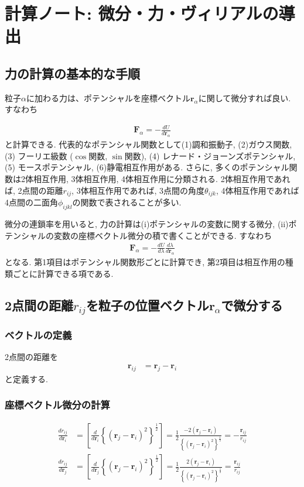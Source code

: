\clearpage
\section{計算ノート: 微分・力・ヴィリアルの導出}
\subsection{力の計算の基本的な手順}
粒子$\alpha$に加わる力は、ポテンシャルを座標ベクトル$\bm{r}_{\alpha}$に関して微分すれば良い. すなわち

\begin{align}
   \bm{F}_{\alpha}
   =
   -
   \frac{d U}{d \bm{r}_{\alpha}}
\end{align}
と計算できる.
代表的なポテンシャル関数として(1)調和振動子, (2)ガウス関数, (3) フーリエ級数 ($\cos$関数, $\sin$関数), (4) レナード・ジョーンズポテンシャル, (5) モースポテンシャル, (6)静電相互作用がある.
さらに, 多くのポテンシャル関数は2体相互作用, 3体相互作用, 4体相互作用に分類される.
2体相互作用であれば, 2点間の距離$r_{ij}$, 3体相互作用であれば, 3点間の角度$\theta_{ijk}$, 4体相互作用であれば4点間の二面角$\phi_{ijkl}$の関数で表されることが多い.

微分の連鎖率を用いると, 力の計算は(i)ポテンシャルの変数に関する微分, (ii)ポテンシャルの変数の座標ベクトル微分の積で書くことができる. すなわち
\begin{align}
   \bm{F}_{\alpha}
   =
   -
   \frac{d U}{d \lambda}
   \frac{d \lambda}{d \bm{r}_{\alpha}}
\end{align}
となる. 第1項目はポテンシャル関数形ごとに計算でき, 第2項目は相互作用の種類ごとに計算できる項である.


\subsection{2点間の距離$r_{ij}$を粒子の位置ベクトル$\bm{r}_{\alpha}$で微分する}
\subsubsection{ベクトルの定義}
2点間の距離を
\begin{align}
   \bm{r}_{ij}
&= \bm{r}_{j} - \bm{r}_{i}
\end{align}
と定義する.

\subsubsection{座標ベクトル微分の計算}
\begin{align}
\frac{d r_{ij}}{d \bm{r}_{i}}
&=
\left[
   \frac{d}{d \bm{r}_{i}}
   \left\{ (\bm{r}_{j} - \bm{r}_{i} )^{2} \right\}^{\frac{1}{2}}
\right]
=
\frac{1}{2}
\frac{ -2 (\bm{r}_{j} - \bm{r}_{i}) }
     { \left\{ ( \bm{r}_{j} - \bm{r}_{i} )^{2} \right\}^{\frac{1}{2}} }
=
-
\frac{\bm{r}_{ij}}{r_{ij}}
\label{Eq:dr_ij-dr_i}
\\
\frac{d r_{ij}}{d \bm{r}_{j}}
&=
\left[
   \frac{d}{d \bm{r}_{j}}
   \left\{ (\bm{r}_{j} - \bm{r}_{i} )^{2} \right\}^{\frac{1}{2}}
\right]
=
\frac{1}{2}
\frac{ 2 (\bm{r}_{j} - \bm{r}_{i}) }
     { \left\{ ( \bm{r}_{j} - \bm{r}_{i} )^{2} \right\}^{\frac{1}{2}} }
=
\frac{\bm{r}_{ij}}{r_{ij}}
\label{Eq:dr_ij-dr_j}
\end{align}

